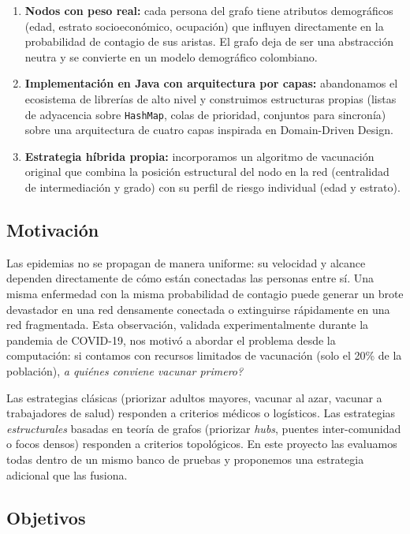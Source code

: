 \documentclass[spanish,notitlepage,letterpaper, 12pt]{article}
\begin{document}
\begin{enumerate}
    \item \textbf{Nodos con peso real:} cada persona del grafo tiene atributos demogr\'aficos (edad, estrato socioecon\'omico, ocupaci\'on) que influyen directamente en la probabilidad de contagio de sus aristas. El grafo deja de ser una abstracci\'on neutra y se convierte en un modelo demogr\'afico colombiano.
    \item \textbf{Implementaci\'on en Java con arquitectura por capas:} abandonamos el ecosistema de librer\'ias de alto nivel y construimos estructuras propias (listas de adyacencia sobre \texttt{HashMap}, colas de prioridad, conjuntos para sincron\'ia) sobre una arquitectura de cuatro capas inspirada en Domain-Driven Design.
    \item \textbf{Estrategia h\'ibrida propia:} incorporamos un algoritmo de vacunaci\'on original que combina la posici\'on estructural del nodo en la red (centralidad de intermediaci\'on y grado) con su perfil de riesgo individual (edad y estrato).
\end{enumerate}

\subsection{Motivaci\'on}

Las epidemias no se propagan de manera uniforme: su velocidad y alcance dependen directamente de c\'omo est\'an conectadas las personas entre s\'i. Una misma enfermedad con la misma probabilidad de contagio puede generar un brote devastador en una red densamente conectada o extinguirse r\'apidamente en una red fragmentada. Esta observaci\'on, validada experimentalmente durante la pandemia de COVID-19, nos motiv\'o a abordar el problema desde la computaci\'on: si contamos con recursos limitados de vacunaci\'on (solo el 20\% de la poblaci\'on), \textit{\textquestiondown a qui\'enes conviene vacunar primero?}

Las estrategias cl\'asicas (priorizar adultos mayores, vacunar al azar, vacunar a trabajadores de salud) responden a criterios m\'edicos o log\'isticos. Las estrategias \textit{estructurales} basadas en teor\'ia de grafos (priorizar \textit{hubs}, puentes inter-comunidad o focos densos) responden a criterios topol\'ogicos. En este proyecto las evaluamos todas dentro de un mismo banco de pruebas y proponemos una estrategia adicional que las fusiona.

\subsection{Objetivos}
\end{document}

